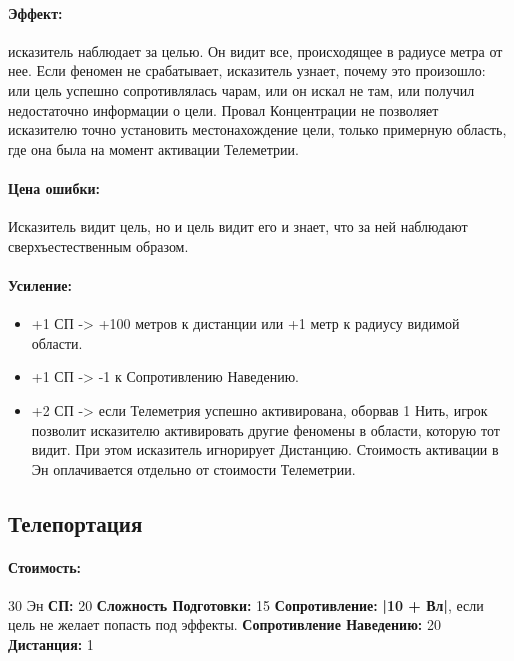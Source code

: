 \paragraph{Эффект: }исказитель наблюдает за целью. Он видит все, происходящее в радиусе метра от нее. Если феномен не срабатывает, исказитель узнает, почему это произошло: или цель успешно сопротивлялась чарам, или он искал не там, или получил недостаточно информации о цели. Провал Концентрации не позволяет исказителю точно установить местонахождение цели, только примерную область, где она была на момент активации Телеметрии.
\paragraph{Цена ошибки: }Исказитель видит цель, но и цель видит его и знает, что за ней наблюдают сверхъестественным образом.
\paragraph{Усиление:}
\begin{itemize}
\item+1 СП -> +100 метров к дистанции или +1 метр к радиусу видимой области.
\item+1 СП -> -1 к Сопротивлению Наведению.
\item+2 СП -> если Телеметрия успешно активирована, оборвав 1 Нить, игрок позволит исказителю активировать другие феномены в области, которую тот видит. При этом исказитель игнорирует Дистанцию. Стоимость активации в Эн оплачивается отдельно от стоимости Телеметрии.	
\end{itemize}
\subsection{Телепортация}
\paragraph{} 
\textit{
\tbd}
\paragraph{Стоимость: }30 Эн
\leavevmode
\newline 
\textbf{СП: }20
\leavevmode
\newline 
\textbf{Сложность Подготовки: }15
\leavevmode
\newline 
\textbf{Сопротивление: }
\textbf{|10 + Вл|}, если цель не желает попасть под эффекты.
\leavevmode
\newline 
\textbf{Сопротивление Наведению: }20
\leavevmode
\newline 
\textbf{Дистанция: }1
